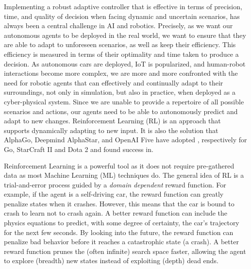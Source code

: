 \documentclass[a4paper,11pt]{article}
\theoremstyle{definition}
\begin{document}
Implementing a robust adaptive controller that is effective in terms
of precision, time, and quality of decision
when facing dynamic and uncertain scenarios, has always been a central
challenge in AI and robotics. Precisely, as we want our autonomous agents to be deployed 
in the real world, we want to ensure that they are able to adapt to unforeseen scenarios, as well as 
keep their efficiency. This efficiency is measured in terms of their optimality and time taken to produce a decision. 
%
As autonomous cars are deployed, IoT is popularized, and human-robot interactions become more complex, we
are more and more confronted with the need for robotic agents that can effectively and continually adapt
to their surroundings, not only in simulation, but also in practice, when deployed as a cyber-physical system. 
Since we are unable to provide a repertoire of all possible scenarios and actions,
our agents need to be able to autonomously predict and adapt to new
changes. Reinforcement Learning (RL) is an approach that
supports dynamically adapting to new input. It is also the solution that AlphaGo, Deepmind AlphaStar, and OpenAI Five have
adopted \cite{li2019reinforcement}, respectively for Go, StarCraft II and Dota 2 and found success in. 

\medskip

Reinforcement Learning is a powerful tool as it does not require
pre-gathered data as most Machine Learning (ML) techniques do. 
%
The general idea of RL is a trial-and-error process guided by a
\textit{domain dependent} reward function.
%
For example, if the agent is a self-driving car, the reward function
can greatly penalize states when it crashes.
%
However, this means that the car is bound to crash to learn not to
crash again.
%
A better reward function can include the physics equations to predict,
with some degree of certainty, the car's trajectory for the next few
seconds.
%
By looking into the future, the reward function can penalize bad
behavior before it reaches a catastrophic state (a crash).
%
A better reward function prunes the (often infinite) search space
faster, allowing the agent to explore (breadth) new states instead of
exploiting (depth) dead ends.
%

\medskip
\end{document}
